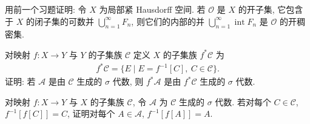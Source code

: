 \documentclass[../../main.tex]{subfiles}
\begin{document}
\begin{exercise}\label{exercise:ch21-19}
用前一个习题证明: 令 $X$ 为局部紧 Hausdorff 空间. 若 $\mathcal{O}$ 是 $X$ 的开子集, 它包含于 $X$ 的闭子集的可数并 $\bigcup_{n=1}^{\infty}F_{n}$, 则它们的内部的并 $\bigcup_{n=1}^{\infty}\operatorname{int}F_{n}$ 是 $\mathcal{O}$ 的开稠密集.
\end{exercise}

\begin{exercise}\label{exercise:ch21-20}
对映射 $f:X\to Y$ 与 $Y$ 的子集族 $\mathcal{C}$ 定义 $X$ 的子集族 $f^{*}\mathcal{C}$ 为
\begin{align*}
f^{*}\mathcal{C}=\{E\mid E=f^{-1}[C],\ C\in\mathcal{C}\}.
\end{align*}
证明: 若 $\mathcal{A}$ 是由 $\mathcal{C}$ 生成的 $\sigma$ 代数, 则 $f^{*}\mathcal{A}$ 是由 $f^{*}\mathcal{C}$ 生成的 $\sigma$ 代数.
\end{exercise}

\begin{exercise}\label{exercise:ch21-21}
对映射 $f:X\to Y$ 与 $X$ 的子集族 $\mathcal{C}$, 令 $\mathcal{A}$ 为 $\mathcal{C}$ 生成的 $\sigma$ 代数. 若对每个 $C\in\mathcal{C}$, $f^{-1}[f[C]]=C$, 证明对每个 $A\in\mathcal{A}$, $f^{-1}[f[A]]=A$.
\end{exercise}
\end{document}
